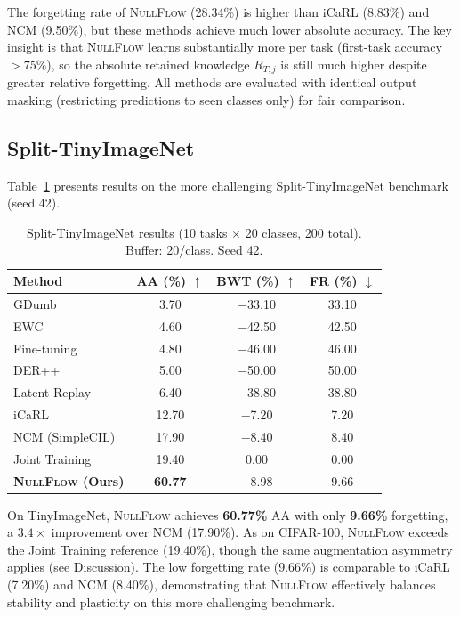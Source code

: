 \documentclass[10pt,twocolumn,letterpaper]{article}
\newcommand{\best}[1]{\textbf{\textcolor{bestcolor}{#1}}}
\newcommand{\second}[1]{\textcolor{secondcolor}{#1}}
\newcommand{\ours}{\textsc{NullFlow}}
\begin{document}
The forgetting rate of \ours{} (28.34\%) is higher than iCaRL (8.83\%) and NCM (9.50\%), but these methods achieve much lower absolute accuracy. The key insight is that \ours{} learns substantially more per task (first-task accuracy $>$75\%), so the absolute retained knowledge $R_{T,j}$ is still much higher despite greater relative forgetting. All methods are evaluated with identical output masking (restricting predictions to seen classes only) for fair comparison.

\FloatBarrier
\subsection{Split-TinyImageNet}

Table~\ref{tab:tinyimagenet} presents results on the more challenging Split-TinyImageNet benchmark (seed 42).

\begin{table}[!t]
\centering
\caption{Split-TinyImageNet results (10 tasks $\times$ 20 classes, 200 total). Buffer: 20/class. Seed 42.}
\label{tab:tinyimagenet}
\setlength{\tabcolsep}{3pt}
\footnotesize
\begin{tabular}{@{}lccc@{}}
\toprule
\textbf{Method} & \textbf{AA (\%) $\uparrow$} & \textbf{BWT (\%) $\uparrow$} & \textbf{FR (\%) $\downarrow$} \\
\midrule
GDumb              & 3.70  & $-$33.10 & 33.10 \\
EWC                & 4.60  & $-$42.50 & 42.50 \\
Fine-tuning        & 4.80  & $-$46.00 & 46.00 \\
DER++              & 5.00  & $-$50.00 & 50.00 \\
Latent Replay      & 6.40  & $-$38.80 & 38.80 \\
iCaRL              & 12.70 & $-$7.20  & 7.20  \\
NCM (SimpleCIL)    & \second{17.90} & $-$8.40  & 8.40  \\
\midrule
Joint Training       & 19.40 & 0.00    & 0.00  \\
\midrule
\textbf{\ours{} (Ours)} & \best{60.77} & $-$8.98 & 9.66 \\
\bottomrule
\end{tabular}
\end{table}

On TinyImageNet, \ours{} achieves \textbf{60.77\%} AA with only \textbf{9.66\%} forgetting, a $3.4\times$ improvement over NCM (17.90\%). As on CIFAR-100, \ours{} exceeds the Joint Training reference (19.40\%), though the same augmentation asymmetry applies (see Discussion). The low forgetting rate (9.66\%) is comparable to iCaRL (7.20\%) and NCM (8.40\%), demonstrating that \ours{} effectively balances stability and plasticity on this more challenging benchmark.
\end{document}
